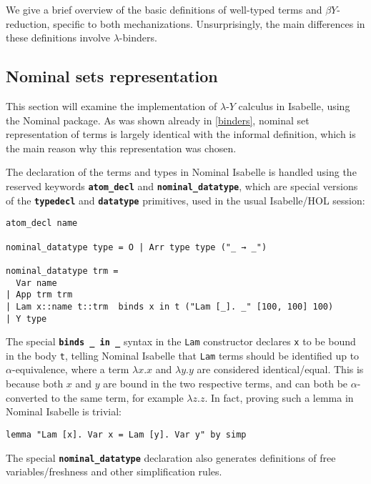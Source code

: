 \documentclass[a4paper, 12pt, twoside]{style/ociamthesis}
\theoremstyle{plain}
\theoremstyle{definition}
\theoremstyle{remark}
\newcommand{\lamy}{\lambda\text{-}Y}
\begin{document}
We give a brief overview of the basic definitions of well-typed terms
and \(\beta Y\)-reduction, specific to both mechanizations.
Unsurprisingly, the main differences in these definitions involve
\(\lambda\)-binders.

\subsection{Nominal sets
representation}\label{nominal-sets-representation}

This section will examine the implementation of \(\lamy\) calculus in
Isabelle, using the Nominal package. As was shown already in
\cref{binders}, nominal set representation of terms is largely identical
with the informal definition, which is the main reason why this
representation was chosen.

The declaration of the terms and types in Nominal Isabelle is handled
using the reserved keywords \textbf{\texttt{atom\_decl}} and
\textbf{\texttt{nominal\_datatype}}, which are special versions of the
\textbf{\texttt{typedecl}} and \textbf{\texttt{datatype}} primitives,
used in the usual Isabelle/HOL session:

\begin{verbatim}
atom_decl name

nominal_datatype type = O | Arr type type ("_ → _")

nominal_datatype trm =
  Var name
| App trm trm
| Lam x::name t::trm  binds x in t ("Lam [_]. _" [100, 100] 100)
| Y type
\end{verbatim}

The special \textbf{\texttt{binds \_ in \_}} syntax in the \texttt{Lam}
constructor declares \texttt{x} to be bound in the body \texttt{t},
telling Nominal Isabelle that \texttt{Lam} terms should be identified up
to \(\alpha\)-equivalence, where a term \(\lambda x. x\) and
\(\lambda y. y\) are considered identical/equal. This is because both
\(x\) and \(y\) are bound in the two respective terms, and can both be
\(\alpha\)-converted to the same term, for example \(\lambda z. z\). In
fact, proving such a lemma in Nominal Isabelle is trivial:

\begin{verbatim}
lemma "Lam [x]. Var x = Lam [y]. Var y" by simp
\end{verbatim}

The special \textbf{\texttt{nominal\_datatype}} declaration also
generates definitions of free variables/freshness and other
simplification rules.
\end{document}
